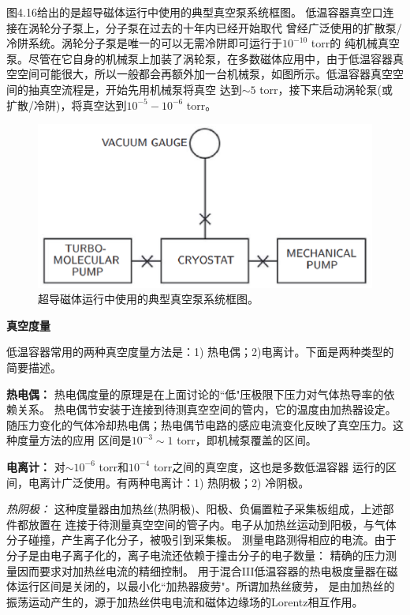 图4.16给出的是超导磁体运行中使用的典型真空泵系统框图。
低温容器真空口连接在涡轮分子泵上，分子泵在过去的十年内已经开始取代
曾经广泛使用的扩散泵/冷阱系统。涡轮分子泵是唯一的可以无需冷阱即可运行于$10^{−10}$ torr的
纯机械真空泵。尽管在它自身的机械泵上加装了涡轮泵，在多数磁体应用中，由于低温容器真空空间可能很大，所以一般都会再额外加一台机械泵，如图所示。低温容器真空空间的抽真空流程是，开始先用机械泵将真空
达到$\sim 5$ torr，接下来启动涡轮泵(或扩散/冷阱)，将真空达到$10^{-5}-10^{-6}$ torr。
\begin{figure}[htbp]
	\centering
	\includegraphics[scale=0.6]{chpt4/figs/fig4.16.eps}
	\caption{超导磁体运行中使用的典型真空泵系统框图。}
\end{figure}

\textbf{真空度量}

低温容器常用的两种真空度量方法是：1) 热电偶；2)电离计。下面是两种类型的简要描述。

\textbf{热电偶：} 热电偶度量的原理是在上面讨论的``低"压极限下压力对气体热导率的依赖关系。
热电偶节安装于连接到待测真空空间的管内，它的温度由加热器设定。
随压力变化的气体冷却热电偶；热电偶节电路的感应电流变化反映了真空压力。这种度量方法的应用
区间是$10^{-3}\sim 1$ torr，即机械泵覆盖的区间。

\textbf{电离计：} 对$\sim 10^{-6}$ torr和$10^{-4}$ torr之间的真空度，这也是多数低温容器
运行的区间，电离计广泛使用。有两种电离计：1) 热阴极；2) 冷阴极。

\textit{热阴极：} 这种度量器由加热丝(热阴极)、阳极、负偏置粒子采集板组成，上述部件都放置在
连接于待测量真空空间的管子内。电子从加热丝运动到阳极，与气体分子碰撞，产生离子化分子，被吸引到采集板。
测量电路测得相应的电流。由于分子是由电子离子化的，离子电流还依赖于撞击分子的电子数量：
精确的压力测量因而要求对加热丝电流的精细控制。
用于混合III低温容器的热电极度量器在磁体运行区间是关闭的，以最小化``加热器疲劳"。所谓加热丝疲劳，
是由加热丝的振荡运动产生的，源于加热丝供电电流和磁体边缘场的Lorentz相互作用。

